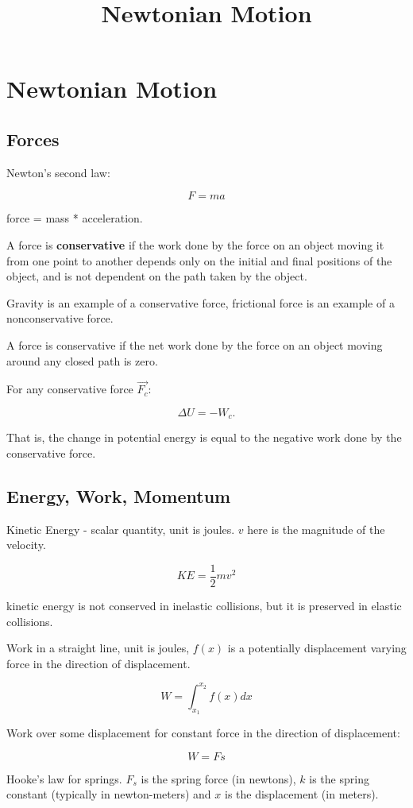 \documentclass{article}
\title{Newtonian Motion}
\begin{document}
\section{Newtonian Motion}

\subsection{Forces}

Newton's second law:

\[ F = ma \]

force = mass * acceleration.

A force is \textbf{conservative} if the work done by the force on an object moving it from one point to another depends only on the initial and final positions of the object, and is not dependent on the path taken by the object.

Gravity is an example of a conservative force, frictional force is an example of a nonconservative force.

A force is conservative if the net work done by the force on an object moving around any closed path is zero.

For any conservative force $\vec{F_c}$:

\[ \Delta U = - W_c. \]

That is, the change in potential energy is equal to the negative work done by the conservative force.

\subsection{Energy, Work, Momentum}

Kinetic Energy - \@{scalar} quantity, unit is joules. $v$ here is the magnitude of the velocity.

\[ KE = \frac{1}{2} m v^2 \]

kinetic energy is not conserved in inelastic collisions, but it is preserved in elastic collisions.

Work in a straight line, unit is joules, $f(x)$ is a potentially displacement varying force in the direction of displacement.

\[ W = \int_{x_1}^{x_2} f(x) dx \]

Work over some displacement for constant force in the direction of displacement:

\[ W = Fs \]

Hooke's law for springs. $F_s$ is the spring force (in newtons), $k$ is the spring constant (typically in newton-meters) and $x$ is the displacement (in meters).
\end{document}
